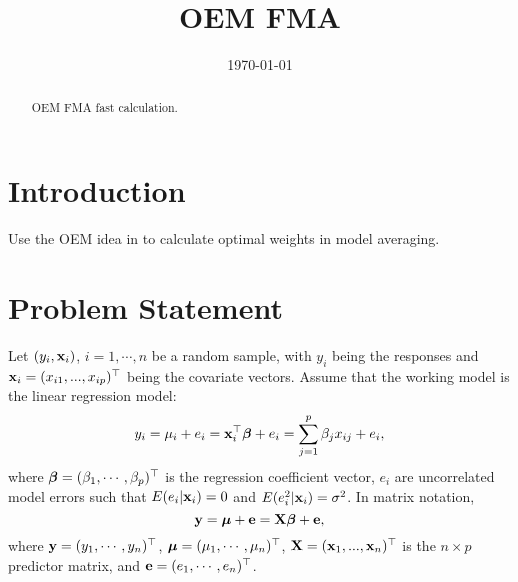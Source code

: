 \documentclass[12pt,hidelinks]{article}
\begin{document}
\title{OEM FMA}
\author{}
\date{\today}
\maketitle
\begin{abstract}
  OEM FMA fast calculation.
\end{abstract}

\section{Introduction}
Use the OEM idea in \cite{Xiong2016} to calculate optimal weights in model averaging. 
\section{Problem Statement}

Let $(y_i,\mathbf{x}_i)$, $i=1,\cdots,n$ be a random sample, with $y_i$ being
the responses and $\mathbf{x}_i=(x_{i1}, ..., x_{ip})^{\top}$ being the
covariate vectors. Assume that the working model is the linear regression model:
\begin{equation*}
  y_i=\mu_i +e_i=\mathbf{x}_i^{\top}\boldsymbol{\beta}+e_i=\sum_{j=1}^p\beta_jx_{ij} +e_i,
\end{equation*}
where $\boldsymbol{\beta} = (\beta_1,\cdots ,\beta_p)^{\top}$ is the
regression coefficient vector, $e_i$ are uncorrelated %
model errors such that
$E(e_i|\mathbf{x}_i) =0$ and $E(e_i^2 |\mathbf{x}_i) =\sigma^2$. In matrix notation,
\begin{equation}\label{model-matrix}
  \mathbf{y} = \boldsymbol{\mu}+\mathbf{e}=\mathbf{X}\boldsymbol{\beta}+\mathbf{e},
\end{equation}
where $\mathbf{y} = (y_1,\cdots ,y_n)^{\top}$,
$\boldsymbol{\mu}=(\mu_1,\cdots,\mu_n)^{\top}$,
$\mathbf{X}=(\mathbf{x}_1, ..., \mathbf{x}_n)^{\top}$ is the $n\times p$
predictor matrix, and $\mathbf{e} = (e_1,\cdots, e_n)^{\top}$.
\end{document}
